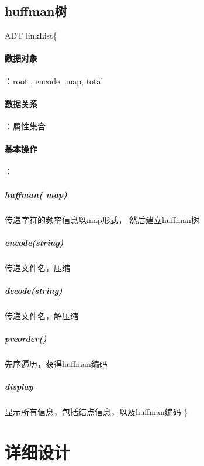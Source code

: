 \documentclass[UTF8]{ctexart}
\begin{document}
\subsection{huffman树}
ADT linkList\{\\
\paragraph{数据对象}：root ,  encode\_map,  total\\
\paragraph{数据关系}：属性集合\\
\paragraph{基本操作}：
\subparagraph{huffman( map)}传递字符的频率信息以map形式， 然后建立huffman树
\subparagraph{encode(string)} 传递文件名，压缩
\subparagraph{decode(string)} 传递文件名，解压缩
\subparagraph{preorder()}先序遍历，获得huffman编码
\subparagraph{display}显示所有信息，包括结点信息，以及huffman编码
\}


\section{详细设计}
\end{document}

